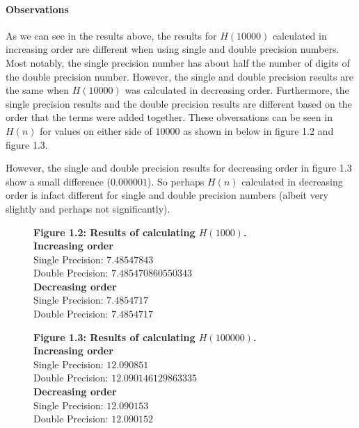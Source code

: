 \documentclass[12pt]{article}
\begin{document}
\paragraph{Observations}
As we can see in the results above, the results for $H(10000)$ calculated in increasing order are different when using single and double precision numbers. Most notably, the single precision number has about half the number of digits of the double precision number. However, the single and double precision results are the same when  $H(10000)$ was calculated in decreasing order. Furthermore, the single precision results and the double precision results are different based on the order that the terms were added together. These obversations can be seen in $H(n)$ for values on either side of $10000$ as shown in below in figure 1.2 and figure 1.3.

However, the single and double precision results for decreasing order in figure 1.3 show a small difference ($0.000001$). So perhaps $H(n)$ calculated in decreasing order is infact different for single and double precision numbers (albeit very slightly and perhaps not significantly).


\begin{figure}[h]
\textbf{Figure 1.2: Results of calculating $H(1000)$.}\\
\textbf{Increasing order}\\
Single Precision: $7.48547843$\\
Double Precision: $7.485470860550343$\\
\textbf{Decreasing order}\\
Single Precision: $7.4854717$\\
Double Precision: $7.4854717$
\end{figure}
	
\begin{figure}[h]
	\textbf{Figure 1.3: Results of calculating $H(100000)$.}\\
	\textbf{Increasing order}\\
	Single Precision: $12.090851$\\
	Double Precision: $12.090146129863335$\\
	\textbf{Decreasing order}\\
	Single Precision: $12.090153$\\
	Double Precision: $12.090152$	
\end{figure}	

\paragraph{}
\end{document}
